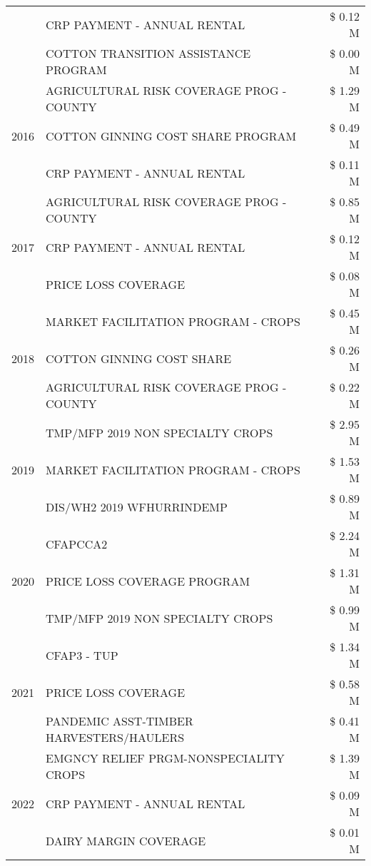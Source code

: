 \begin{tabular}{llr}
 & CRP PAYMENT - ANNUAL RENTAL & \$ 0.12 M \\
 & COTTON TRANSITION ASSISTANCE PROGRAM & \$ 0.00 M \\
\cline{1-3}
\multirow[t]{3}{*}{2016} & AGRICULTURAL RISK COVERAGE PROG - COUNTY & \$ 1.29 M \\
 & COTTON GINNING COST SHARE PROGRAM & \$ 0.49 M \\
 & CRP PAYMENT - ANNUAL RENTAL & \$ 0.11 M \\
\cline{1-3}
\multirow[t]{3}{*}{2017} & AGRICULTURAL RISK COVERAGE PROG - COUNTY & \$ 0.85 M \\
 & CRP PAYMENT - ANNUAL RENTAL & \$ 0.12 M \\
 & PRICE LOSS COVERAGE & \$ 0.08 M \\
\cline{1-3}
\multirow[t]{3}{*}{2018} & MARKET FACILITATION PROGRAM - CROPS & \$ 0.45 M \\
 & COTTON GINNING COST SHARE & \$ 0.26 M \\
 & AGRICULTURAL RISK COVERAGE PROG - COUNTY & \$ 0.22 M \\
\cline{1-3}
\multirow[t]{3}{*}{2019} & TMP/MFP 2019 NON SPECIALTY CROPS & \$ 2.95 M \\
 & MARKET FACILITATION PROGRAM - CROPS & \$ 1.53 M \\
 & DIS/WH2 2019 WFHURRINDEMP & \$ 0.89 M \\
\cline{1-3}
\multirow[t]{3}{*}{2020} & CFAPCCA2 & \$ 2.24 M \\
 & PRICE LOSS COVERAGE PROGRAM & \$ 1.31 M \\
 & TMP/MFP 2019 NON SPECIALTY CROPS & \$ 0.99 M \\
\cline{1-3}
\multirow[t]{3}{*}{2021} & CFAP3 - TUP & \$ 1.34 M \\
 & PRICE LOSS COVERAGE & \$ 0.58 M \\
 & PANDEMIC ASST-TIMBER HARVESTERS/HAULERS & \$ 0.41 M \\
\cline{1-3}
\multirow[t]{3}{*}{2022} & EMGNCY RELIEF PRGM-NONSPECIALITY CROPS & \$ 1.39 M \\
 & CRP PAYMENT - ANNUAL RENTAL & \$ 0.09 M \\
 & DAIRY MARGIN COVERAGE & \$ 0.01 M \\
\cline{1-3}
\bottomrule
\end{tabular}
